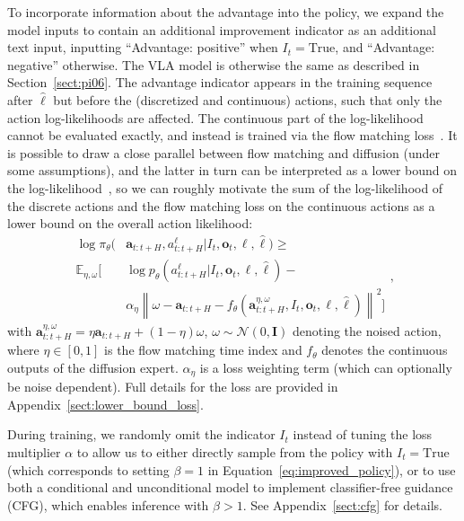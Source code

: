 \documentclass[conference]{IEEEtran}
\newcommand{\ba}{\mathbf{a}}
\newcommand{\bo}{\mathbf{o}}
\newcommand{\bI}{\mathbf{I}}
\newcommand{\lang}{\ell}
\newcommand{\rawtext}{\hat{\ell}} %
\begin{document}
To incorporate information about the advantage into the policy, we expand the model inputs to contain an additional improvement indicator as an additional text input, inputting ``Advantage: positive'' when $I_t = \text{True}$, and ``Advantage: negative'' otherwise.
The VLA model is otherwise the same as described in Section~\ref{sect:pi06}. The advantage indicator appears in the training sequence after $\rawtext$ but before the (discretized and continuous) actions, such that only the action log-likelihoods are affected. The continuous part of the log-likelihood cannot be evaluated exactly, and instead is trained via the flow matching loss~\citep{lipman2022flow}. It is possible to draw a close parallel between flow matching and diffusion (under some assumptions), and the latter in turn can be interpreted as a lower bound on the log-likelihood~\citep{KingaDiffELBO}, so we can roughly motivate the sum of the log-likelihood of the discrete actions and the flow matching loss on the continuous actions as a lower bound on the overall action likelihood:
\begin{equation}
\begin{aligned}
    \log \pi_\theta(&\ba_{t:t+H}, a^{\ell}_{t:t+H} \vert I_t, \bo_t, \lang, \rawtext) \geq \\  \mathbb{E}_{\eta, \omega} \Big[& \log p_\theta(a^{\ell}_{t:t+H} |  I_t, \bo_t, \lang, \rawtext) -
     \\ & \alpha_\eta \left\|\omega - \ba_{t:t+H} - f_\theta(\ba^{\eta, \omega}_{t:t+H}, I_t, \bo_t, \lang, \rawtext)\right\|^2 \Big] 
\end{aligned}
\label{eq:cotraining},
\end{equation}
with $\ba_{t:t+H}^{\eta, \omega} = \eta \ba_{t:t+H} + (1-\eta)\omega$, $\omega \sim \mathcal{N}(0,\bI)$ denoting the noised action, where $\eta \in [0,1]$ is the flow matching time index and $f_\theta$ denotes the continuous outputs of the diffusion expert. $\alpha_\eta$ is a loss weighting term (which can optionally be noise dependent). Full details for the loss are provided in Appendix~\ref{sect:lower_bound_loss}.

During training, we randomly omit the indicator $I_t$ instead of tuning the loss multiplier $\alpha$ to allow us to either directly sample from the policy with $I_t = \text{True}$ (which corresponds to setting $\beta = 1$ in Equation~\eqref{eq:improved_policy}), or to use both a conditional and unconditional model to implement classifier-free guidance (CFG), which enables inference with $\beta > 1$. See Appendix~\ref{sect:cfg} for details.
\end{document}
